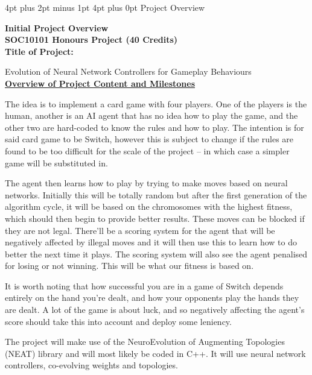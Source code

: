 \documentclass[12pt,a4paper]{article}
\makeatletter
\renewcommand\section{\@startsection {section}{1}{0mm} %
                               {4pt plus 2pt minus 1pt} %
                               {4pt plus 0pt} %
                               {\bfseries}}
\makeatother
\begin{document}
\newpage
\begin{appendices}
\section{Project Overview}

\Large{\textbf{Initial Project Overview}\\

\textbf{SOC10101 Honours Project (40 Credits)}}\\                                                      

\large{\textbf{Title of Project:}}

\normalsize{Evolution of Neural Network Controllers for Gameplay Behaviours} \\

\underline{\textbf{Overview of Project Content and Milestones}}

The idea is to implement a card game with four players. One of the players is the human, another is an AI agent that has no idea how to play the game, and the other two are hard-coded to know the rules and how to play. The intention is for said card game to be Switch, however this is subject to change if the rules are found to be too difficult for the scale of the project – in which case a simpler game will be substituted in.


The agent then learns how to play by trying to make moves based on neural networks. Initially this will be totally random but after the first generation of the algorithm cycle, it will be based on the chromosomes with the highest fitness, which should then begin to provide better results. These moves can be blocked if they are not legal. There'll be a scoring system for the agent that will be negatively affected by illegal moves and it will then use this to learn how to do better the next time it plays. The scoring system will also see the agent penalised for losing or not winning. This will be what our fitness is based on. 


It is worth noting that how successful you are in a game of Switch depends entirely on the hand you’re dealt, and how your opponents play the hands they are dealt. A lot of the game is about luck, and so negatively affecting the agent’s score should take this into account and deploy some leniency. 


The project will make use of the NeuroEvolution of Augmenting Topologies (NEAT) library and will most likely be coded in C++. It will use neural network controllers, co-evolving weights and topologies. \\


\end{appendices}
\end{document}
